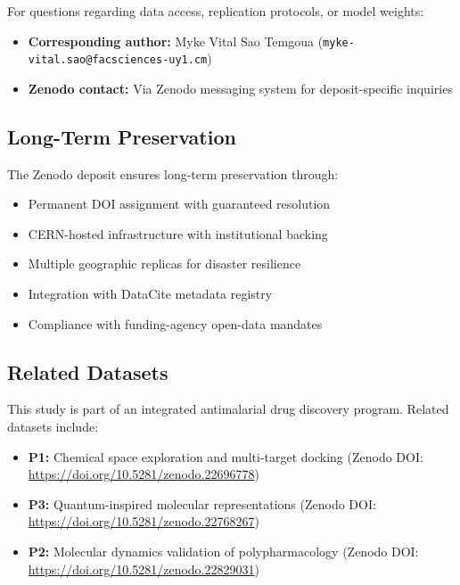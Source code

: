 \documentclass[11pt,a4paper]{article}
\begin{document}
For questions regarding data access, replication protocols, or model weights:

\begin{itemize}[leftmargin=*,itemsep=0.2em]
\item \textbf{Corresponding author:} Myke Vital Sao Temgoua (\texttt{myke-vital.sao@facsciences-uy1.cm})
\item \textbf{Zenodo contact:} Via Zenodo messaging system for deposit-specific inquiries
\end{itemize}

\subsection*{Long-Term Preservation}

The Zenodo deposit ensures long-term preservation through:

\begin{itemize}[leftmargin=*,itemsep=0.3em]
\item Permanent DOI assignment with guaranteed resolution
\item CERN-hosted infrastructure with institutional backing
\item Multiple geographic replicas for disaster resilience
\item Integration with DataCite metadata registry
\item Compliance with funding-agency open-data mandates
\end{itemize}

\subsection*{Related Datasets}

This study is part of an integrated antimalarial drug discovery program. Related datasets include:

\begin{itemize}[leftmargin=*,itemsep=0.3em]
\item \textbf{P1:} Chemical space exploration and multi-target docking (Zenodo DOI: \url{https://doi.org/10.5281/zenodo.22696778})
\item \textbf{P3:} Quantum-inspired molecular representations (Zenodo DOI: \url{https://doi.org/10.5281/zenodo.22768267})
\item \textbf{P2:} Molecular dynamics validation of polypharmacology (Zenodo DOI: \url{https://doi.org/10.5281/zenodo.22829031})
\end{itemize}
\end{document}
